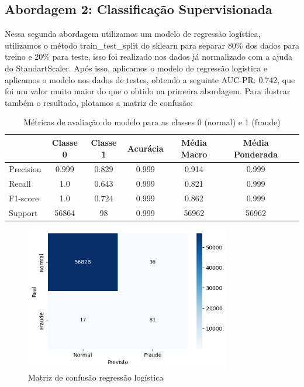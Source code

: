 \documentclass[a4paper,12pt]{article}
\begin{document}
\subsection{Abordagem 2: Classificação Supervisionada}
\label{subsec:abordagem2}
  Nessa segunda abordagem utilizamos um modelo de regressão logística, utilizamos o método train\_test\_split do sklearn para separar 80\% dos dados para treino e 20\% para teste, isso foi realizado nos dados já normalizado com a ajuda do StandartScaler. Após isso, aplicamos o modelo de regressão logística e aplicamos o modelo nos dados de testes, obtendo a seguinte AUC-PR: 0.742, que foi um valor muito maior do que o obtido na primeira abordagem. Para ilustrar também o resultado, plotamos a matriz de confusão:
  \begin{table}[H]
      \centering
      \begin{tabular}{lcccccc}
          \toprule
          & \textbf{Classe 0} & \textbf{Classe 1} & \textbf{Acurácia} & \textbf{Média Macro} & \textbf{Média Ponderada} \\
          \midrule
          Precision   & 0.999 & 0.829 & 0.999 & 0.914 & 0.999 \\
          Recall     & 1.0 & 0.643 & 0.999 & 0.821 & 0.999 \\
          F1-score               & 1.0 & 0.724 & 0.999 & 0.862 & 0.999 \\
          Support      & 56864    & 98       & 0.999 & 56962    & 56962    \\
          \bottomrule
      \end{tabular}
      \caption{Métricas de avaliação do modelo para as classes 0 (normal) e 1 (fraude)}
      \label{tab:metricas_classificacao}
  \end{table}
  \begin{figure}[H]
    \centering
    \includegraphics[width=0.8\textwidth]{../output/matriz de confusao sem threshold regressao logistica.png}
    \caption{Matriz de confusão regressão logística}
    \label{fig:matriz_confusao_regressao_logistica}
  \end{figure}
\end{document}
